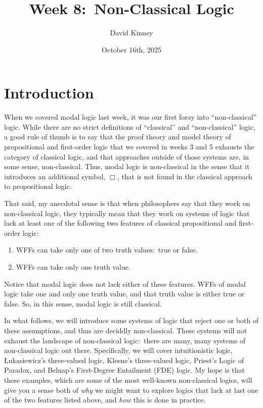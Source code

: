 \documentclass[11pt]{article}
\title{Week 8:\ Non-Classical Logic}
\author{David Kinney}
\date{October 16th, 2025}
\theoremstyle{definition}
\theoremstyle{remark}
\begin{document}
\maketitle

\section{Introduction}
When we covered modal logic last week, it was our first foray into ``non-classical'' logic. While there are no strict definitions of ``classical'' and ``non-classical'' logic, a good rule of thumb is to say that the proof theory and model theory of propositional and first-order logic that we covered in weeks 3 and 5 exhausts the category of classical logic, and that approaches outside of those systems are, in some sense, non-classical. Thus, modal logic is non-classical in the sense that it introduces an additional symbol, $\Box$, that is not found in the classical approach to propositional logic.\par 

That said, my anecdotal sense is that when philosophers say that they work on non-classical logic, they typically mean that they work on systems of logic that lack at least one of the following two features of classical propositional and first-order logic:
\begin{enumerate}
    \item WFFs can take only one of two truth values:\ true or false.

    \item WFFs can take only one truth value.
\end{enumerate}
Notice that modal logic does not lack either of these features. WFFs of modal logic take one and only one truth value, and that truth value is either true or false. So, in this sense, modal logic is still classical.\par 

In what follows, we will introduce some systems of logic that reject one or both of these assumptions, and thus are deciddly non-classical. These systems will not exhaust the landscape of non-classical logic:\ there are many, many systems of non-classical logic out there. Specifically, we will cover intuitionistic logic, Łukasiewicz's three-valued logic, Kleene's three-valued logic, Priest's Logic of Paradox, and Belnap's First-Degree Entailment (FDE) logic. My hope is that these examples, which are some of the most well-known non-classical logics, will give you a sense both of \textit{why} we might want to explore logics that lack at last one of the two features listed above, and \textit{how} this is done in practice.\par 
\end{document}
